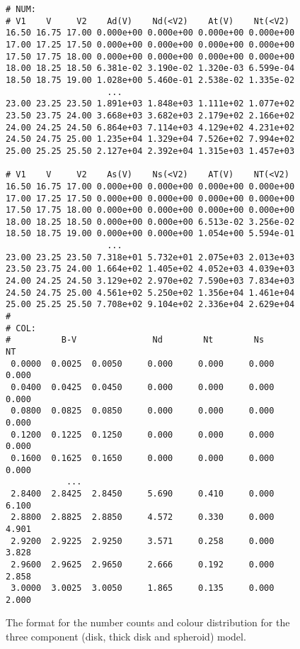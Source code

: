 \begin{figure}[p]
\begin{center}
\begin{verbatim}
# NUM:
# V1    V     V2    Ad(V)    Nd(<V2)    At(V)    Nt(<V2)
16.50 16.75 17.00 0.000e+00 0.000e+00 0.000e+00 0.000e+00
17.00 17.25 17.50 0.000e+00 0.000e+00 0.000e+00 0.000e+00
17.50 17.75 18.00 0.000e+00 0.000e+00 0.000e+00 0.000e+00
18.00 18.25 18.50 6.381e-02 3.190e-02 1.320e-03 6.599e-04
18.50 18.75 19.00 1.028e+00 5.460e-01 2.538e-02 1.335e-02
					...
23.00 23.25 23.50 1.891e+03 1.848e+03 1.111e+02 1.077e+02
23.50 23.75 24.00 3.668e+03 3.682e+03 2.179e+02 2.166e+02
24.00 24.25 24.50 6.864e+03 7.114e+03 4.129e+02 4.231e+02
24.50 24.75 25.00 1.235e+04 1.329e+04 7.526e+02 7.994e+02
25.00 25.25 25.50 2.127e+04 2.392e+04 1.315e+03 1.457e+03

# V1    V     V2    As(V)    Ns(<V2)    AT(V)    NT(<V2)
16.50 16.75 17.00 0.000e+00 0.000e+00 0.000e+00 0.000e+00
17.00 17.25 17.50 0.000e+00 0.000e+00 0.000e+00 0.000e+00
17.50 17.75 18.00 0.000e+00 0.000e+00 0.000e+00 0.000e+00
18.00 18.25 18.50 0.000e+00 0.000e+00 6.513e-02 3.256e-02
18.50 18.75 19.00 0.000e+00 0.000e+00 1.054e+00 5.594e-01
					...
23.00 23.25 23.50 7.318e+01 5.732e+01 2.075e+03 2.013e+03
23.50 23.75 24.00 1.664e+02 1.405e+02 4.052e+03 4.039e+03
24.00 24.25 24.50 3.129e+02 2.970e+02 7.590e+03 7.834e+03
24.50 24.75 25.00 4.561e+02 5.250e+02 1.356e+04 1.461e+04
25.00 25.25 25.50 7.708e+02 9.104e+02 2.336e+04 2.629e+04
#
# COL:
#          B-V               Nd        Nt        Ns        NT
 0.0000  0.0025  0.0050     0.000     0.000     0.000     0.000
 0.0400  0.0425  0.0450     0.000     0.000     0.000     0.000
 0.0800  0.0825  0.0850     0.000     0.000     0.000     0.000
 0.1200  0.1225  0.1250     0.000     0.000     0.000     0.000
 0.1600  0.1625  0.1650     0.000     0.000     0.000     0.000
			...
 2.8400  2.8425  2.8450     5.690     0.410     0.000     6.100
 2.8800  2.8825  2.8850     4.572     0.330     0.000     4.901
 2.9200  2.9225  2.9250     3.571     0.258     0.000     3.828
 2.9600  2.9625  2.9650     2.666     0.192     0.000     2.858
 3.0000  3.0025  3.0050     1.865     0.135     0.000     2.000
\end{verbatim}
\end{center}
\caption{The format for the number counts and colour distribution for the 
three component (disk, thick disk and spheroid) model.}
\end{figure}

